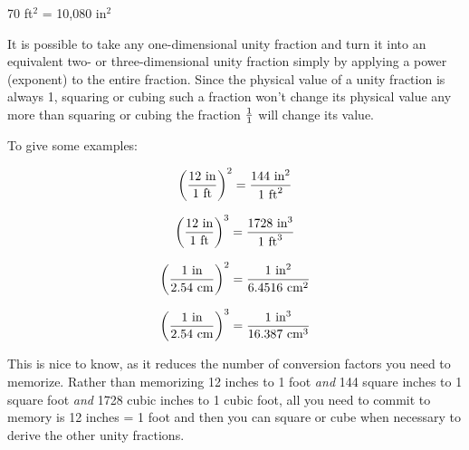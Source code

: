 70 ft$^{2}$ = 10,080 in$^{2}$

\vskip 10pt

It is possible to take any one-dimensional unity fraction and turn it into an equivalent two- or three-dimensional unity fraction simply by applying a power (exponent) to the entire fraction.  Since the physical value of a unity fraction is always 1, squaring or cubing such a fraction won't change its physical value any more than squaring or cubing the fraction $1 \over 1$ will change its value.

To give some examples:

$$\left({{12 \hbox{ in}} \over {1 \hbox{ ft}}}\right)^2 = {{144 \hbox{ in}^2} \over {1 \hbox{ ft}^2}}$$

\vskip 10pt

$$\left({{12 \hbox{ in}} \over {1 \hbox{ ft}}}\right)^3 = {{1728 \hbox{ in}^3} \over {1 \hbox{ ft}^3}}$$

\vskip 10pt

$$\left({{1 \hbox{ in}} \over {2.54 \hbox{ cm}}}\right)^2 = {{1 \hbox{ in}^2} \over {6.4516 \hbox{ cm}^2}}$$

\vskip 10pt

$$\left({{1 \hbox{ in}} \over {2.54 \hbox{ cm}}}\right)^3 = {{1 \hbox{ in}^3} \over {16.387 \hbox{ cm}^3}}$$

This is nice to know, as it reduces the number of conversion factors you need to memorize.  Rather than memorizing 12 inches to 1 foot {\it and} 144 square inches to 1 square foot {\it and} 1728 cubic inches to 1 cubic foot, all you need to commit to memory is 12 inches = 1 foot and then you can square or cube when necessary to derive the other unity fractions.











